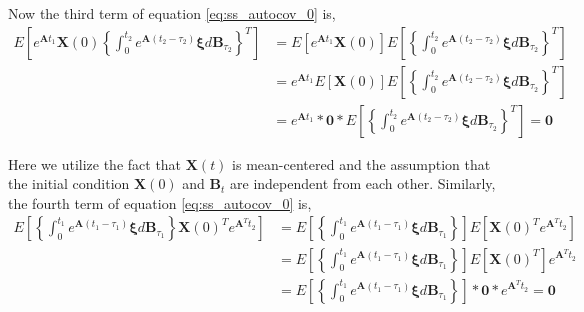 \documentclass{article}
\begin{document}
Now the third term of equation \ref{eq:ss_autocov_0} is,
\begin{equation}
\begin{aligned}
E \left[ e^{\mathbf{A}t_{1}} \mathbf{X}(0) \left \{ \int_0^{t_{2}} e^{\mathbf{A}(t_{2}-\tau_2)} \boldsymbol{\xi} d\mathbf{B}_{\tau_2} \right \}^T \right] &=E\left[ e^{\mathbf{A}t_{1}} \mathbf{X}(0) \right] E \left[ \left \{ \int_0^{t_{2}} e^{\mathbf{A}(t_{2}-\tau_2)} \boldsymbol{\xi} d\mathbf{B}_{\tau_2} \right \}^T \right] \\
& = e^{\mathbf{A}t_{1}} E\left[  \mathbf{X}(0) \right] E \left[ \left \{ \int_0^{t_{2}} e^{\mathbf{A}(t_{2}-\tau_2)} \boldsymbol{\xi} d\mathbf{B}_{\tau_2} \right \}^T \right] \\
&= e^{\mathbf{A}t_{1}} * \mathbf{0} * E \left[ \left \{ \int_0^{t_{2}} e^{\mathbf{A}(t_{2}-\tau_2)} \boldsymbol{\xi} d\mathbf{B}_{\tau_2} \right \}^T \right]=\mathbf{0}
\end{aligned}
\label{eq:ss_autocov_2nd_term}
\end{equation}

Here we utilize the fact that $\mathbf{X}(t)$ is mean-centered and the assumption that the initial condition $\mathbf{X}(0)$ and $\mathbf{B}_t$ are independent from each other.
Similarly, the fourth term of equation \ref{eq:ss_autocov_0} is,
\begin{equation}
\begin{aligned}
E \left [ \left \{ \int_0^{t_{1}} e^{\mathbf{A}(t_{1}-\tau_1)} \boldsymbol{\xi} d\mathbf{B}_{\tau_1} \right \} \mathbf{X}(0)^T e^{\mathbf{A}^T t_{2}} \right ] & = E\left[\left \{ \int_0^{t_{1}} e^{\mathbf{A}(t_{1}-\tau_1)} \boldsymbol{\xi} d\mathbf{B}_{\tau_1} \right \} \right] E \left[ \mathbf{X}(0)^T e^{\mathbf{A}^T t_{2}} \right] \\
&= E\left[ \left \{ \int_0^{t_{1}} e^{\mathbf{A}(t_{1}-\tau_1)} \boldsymbol{\xi} d\mathbf{B}_{\tau_1} \right \} \right] E \left[ \mathbf{X}(0)^T \right] e^{\mathbf{A}^T t_{2}} \\
&=E\left[ \left \{ \int_0^{t_{1}} e^{\mathbf{A}(t_{1}-\tau_1)} \boldsymbol{\xi} d\mathbf{B}_{\tau_1} \right \} \right] * \mathbf{0} * e^{\mathbf{A}^T t_{2}}=\mathbf{0}
\end{aligned}
\label{eq:ss_autocov_3rd_term}
\end{equation}
\end{document}
